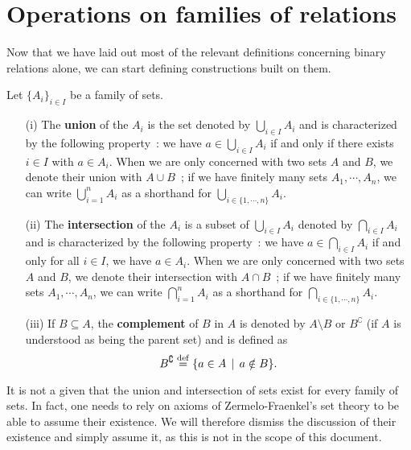 \section{Operations on families of relations}

Now that we have laid out most of the relevant definitions concerning binary relations alone, we can start defining constructions built on them. 
\\

\begin{definition}
	Let $\{A_i\}_{i \in I}$ be a family of sets.
	\\
	
	\begin{itemize}
		\item[(i)] The \textbf{union} of the $A_i$ is the set denoted by $\bigcup_{i \in I} A_i$ and is characterized by the following property~: we have $a \in \bigcup_{i \in I} A_i$ if and only if there exists $i \in I$ with $a \in A_i$. When we are only concerned with two sets $A$ and $B$, we denote their union with $A \cup B$~; if we have finitely many sets $A_1,\cdots,A_n$, we can write $\bigcup_{i=1}^n A_i$ as a shorthand for $\bigcup_{i \in \{1,\cdots,n\}} A_i$. 
		\\

		\item[(ii)] The \textbf{intersection} of the $A_i$ is a subset of $\bigcup_{i \in I} A_i$ denoted by $\bigcap_{i \in I} A_i$ and is characterized by the following property~: we have $a \in \bigcap_{i \in I} A_i$ if and only for all $i \in I$, we have $a \in A_i$. When we are only concerned with two sets $A$ and $B$, we denote their intersection with $A \cap B$~; if we have finitely many sets $A_1,\cdots,A_n$, we can write $\bigcap_{i=1}^n A_i$ as a shorthand for $\bigcap_{i \in \{1,\cdots,n\}} A_i$. 
		\\

		\item[(iii)] If $B \subseteq A$, the \textbf{complement} of $B$ in $A$ is denoted by $A \setminus B$ or $B^{\complement}$ (if $A$ is understood as being the parent set) and is defined as
		\[
			B^{\complement} \overset{\mathrm{def}}{=} \{ a \in A \, \mid \, a \notin B \}.
		\]
	\end{itemize}
\end{definition}

\begin{remark}
	It is not a given that the union and intersection of sets exist for every family of sets. In fact, one needs to rely on axioms of Zermelo-Fraenkel's set theory to be able to assume their existence. We will therefore dismiss the discussion of their existence and simply assume it, as this is not in the scope of this document.
\end{remark}


